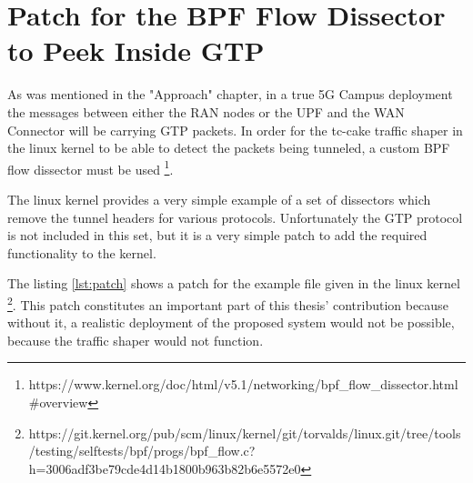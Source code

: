 

\cleardoublepage
\chapter{Patch for the BPF Flow Dissector to Peek Inside GTP}
\label{appendix:patch}

As was mentioned in the "Approach" chapter, in a true 5G Campus deployment the messages between either the RAN nodes or the UPF and the WAN Connector will be carrying GTP packets. In order for the tc-cake traffic shaper in the linux kernel to be able to detect the packets being tunneled, a custom BPF flow dissector must be used \footnote{https://www.kernel.org/doc/html/v5.1/networking/bpf\_flow\_dissector.html\#overview}.

The linux kernel provides a very simple example of a set of dissectors which remove the tunnel headers for various protocols. Unfortunately the GTP protocol is not included in this set, but it is a very simple patch to add the required functionality to the kernel.

The listing \ref{lst:patch} shows a patch for the example file given in the linux kernel \footnote{https://git.kernel.org/pub/scm/linux/kernel/git/torvalds/linux.git/tree/tools/testing/selftests/bpf/progs/bpf\_flow.c?h=3006adf3be79cde4d14b1800b963b82b6e5572e0}. This patch constitutes an important part of this thesis' contribution because without it, a realistic deployment of the proposed system would not be possible, because the traffic shaper would not function.

\clearpage

